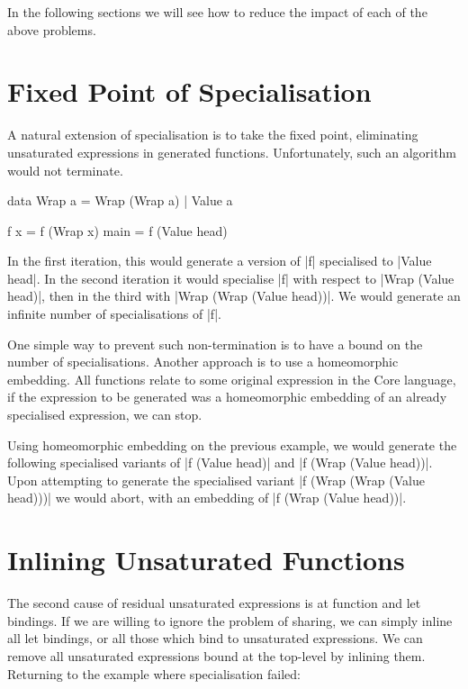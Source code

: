 In the following sections we will see how to reduce the impact of each of the above problems.

\section{Fixed Point of Specialisation}

A natural extension of specialisation is to take the fixed point, eliminating unsaturated expressions in generated functions. Unfortunately, such an algorithm would not terminate.

\begin{example}
\begin{code}
data Wrap a  =  Wrap (Wrap a)
             |  Value a

f x = f (Wrap x)
main = f (Value head)
\end{code}

In the first iteration, this would generate a version of |f| specialised to |Value head|. In the second iteration it would specialise |f| with respect to |Wrap (Value head)|, then in the third with |Wrap (Wrap (Value head))|. We would generate an infinite number of specialisations of |f|.
\end{example}

One simple way to prevent such non-termination is to have a bound on the number of specialisations. Another approach is to use a homeomorphic embedding. All functions relate to some original expression in the Core language, if the expression to be generated was a homeomorphic embedding of an already specialised expression, we can stop.

Using homeomorphic embedding on the previous example, we would generate the following specialised variants of |f (Value head)| and |f (Wrap (Value head))|. Upon attempting to generate the specialised variant |f (Wrap (Wrap (Value head)))| we would abort, with an embedding of |f (Wrap (Value head))|.


\section{Inlining Unsaturated Functions}

The second cause of residual unsaturated expressions is at function and let bindings. If we are willing to ignore the problem of sharing, we can simply inline all let bindings, or all those which bind to unsaturated expressions. We can remove all unsaturated expressions bound at the top-level by inlining them. Returning to the example where specialisation failed:

